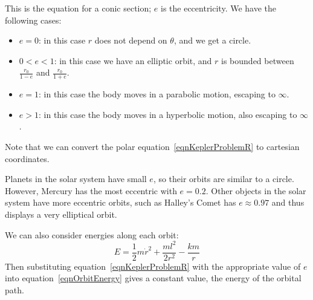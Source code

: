 \documentclass[../Main.tex]{subfiles}
\begin{document}
This is the equation for a conic section; $e$ is the eccentricity. We have the following cases:
\begin{itemize}
    \item $e = 0$: in this case $r$ does not depend on $\theta$, and we get a circle.
    \item $0 < e < 1$: in this case we have an elliptic orbit, and $r$ is bounded between $\frac{r_0}{1-e}$ and $\frac{r_0}{1+e}$.
    \item $e = 1$: in this case the body moves in a parabolic motion, escaping to $\infty$.
    \item $e > 1$: in this case the body moves in a hyperbolic motion, also escaping to $\infty$.
\end{itemize}
Note that we can convert the polar equation~\ref{eqnKeplerProblemR} to cartesian coordinates.\par
Planets in the solar system have small $e$, so their orbits are similar to a circle. However, Mercury has the most eccentric with $e = 0.2$. Other objects in the solar system have more eccentric orbits, such as Halley's Comet has $e \approx 0.97$ and thus displays a very elliptical orbit.\par
We can also consider energies along each orbit:
\begin{equation}
    E = \frac{1}{2}m\dot{r}^2 + \frac{ml^2}{2r^2} - \frac{km}{r}
    \label{eqnOrbitEnergy}
\end{equation}
Then substituting equation~\ref{eqnKeplerProblemR} with the appropriate value of $e$ into equation~\ref{eqnOrbitEnergy} gives a constant value, the energy of the orbital path.
\end{document}
